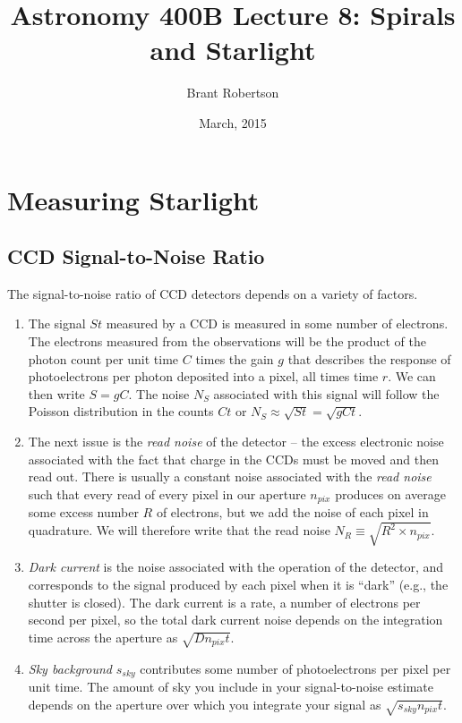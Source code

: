 \documentclass[]{article}
\title{Astronomy 400B Lecture 8: Spirals and Starlight}
\author{Brant Robertson}
\date{March, 2015}
\begin{document}
\maketitle

\section{Measuring Starlight}

\subsection{CCD Signal-to-Noise Ratio}

The signal-to-noise ratio of CCD detectors
depends on a variety of factors. 

\begin{enumerate}

\item The signal $St$ measured by a CCD
is measured in some number of electrons.
The electrons measured from the
observations will be the
product of the photon count per unit
time $C$ times
the gain $g$ that describes the response
of photoelectrons per photon deposited into
a pixel, all times time $r$.  We can then write $S=gC$. The
noise $N_S$ associated with this signal will follow
the Poisson distribution in the counts $Ct$
or $N_S\approx\sqrt{St}=\sqrt{gCt}$.

\item The
next issue is the {\it read noise} of the
detector -- the excess electronic noise
associated with the fact that charge in the
CCDs must be moved and then read out. There
is usually a constant noise associated with
the {\it read noise} such that every
read of every pixel in our aperture $n_{pix}$ 
produces on average some excess number
$R$ of electrons, but we add the noise of
each pixel in quadrature. We will therefore write that
the read noise $N_R \equiv \sqrt{R^2 \times n_{pix}}$.

\item {\it Dark current} is the noise associated
with the operation of the detector, and corresponds
to the signal produced by each pixel when it is
``dark'' (e.g., the shutter is closed).  The
dark current is a rate, a number of electrons per
second per pixel, so the total dark current noise depends on the
integration time across the aperture as $\sqrt{Dn_{pix}t}$.

\item {\it Sky background} $s_{sky}$ contributes some number of photoelectrons per pixel per
unit time. The amount of sky you include in your signal-to-noise
estimate depends on the aperture over which you integrate your
signal as $\sqrt{s_{sky} n_{pix} t}$.

\end{enumerate}
\end{document}
